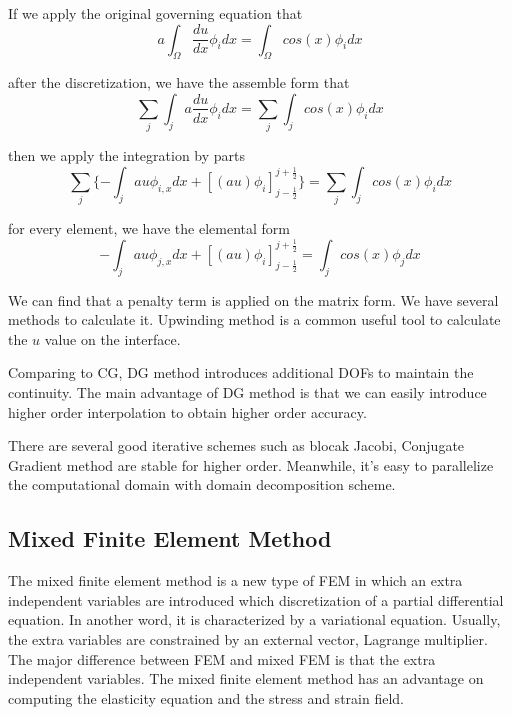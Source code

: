 If we apply the original governing equation that
\begin{equation}
a \int_{\Omega} \frac{du}{dx} \phi_{i}  dx = \int_{\Omega} cos(x) \phi_{i} dx
\end{equation}

after the discretization, we have the assemble form that
\begin{equation}
\sum_{j} \int_{j} a \frac{du}{dx} \phi_{i} dx = \sum_{j} \int_{j} cos(x) \phi_{i} dx
\end{equation}

then we apply the integration by parts
\begin{equation}
\sum_{j} \{ -\int_{j} a u \phi_{i, x} dx + [(a u)\phi_{i}]^{j + \frac{1}{2}}_{j - \frac{1}{2}} \} = \sum_{j} \int_{j} cos(x) \phi_{i} dx
\end{equation}

for every element, we have the elemental form 
\begin{equation}
-\int_{j} au\phi_{j,x} dx + [(au)\phi_{i}]^{j + \frac{1}{2}}_{j - \frac{1}{2}} = \int_{j} cos(x) \phi_{j} dx
\end{equation}

We can find that a penalty term is applied on the matrix form. We have several methods to calculate it. Upwinding method is a common useful tool to calculate the $ u $ value on the interface.

Comparing to CG, DG method introduces additional DOFs to maintain the continuity. The main advantage of DG method is that we can easily introduce higher order interpolation to obtain higher order accuracy.

There are several good iterative schemes such as blocak Jacobi, Conjugate Gradient method are stable for higher order. Meanwhile, it's easy to parallelize the computational domain with domain decomposition scheme.


\subsection{Mixed Finite Element Method}

The mixed finite element method is a new type of FEM in which an extra independent variables are introduced which discretization of a partial differential equation. In another word, it is characterized by a variational equation. Usually, the extra variables are constrained by an external vector, Lagrange multiplier. The major difference between FEM and mixed FEM is that the extra independent variables. The mixed finite element method has an advantage on computing the elasticity equation and the stress and strain field. 

